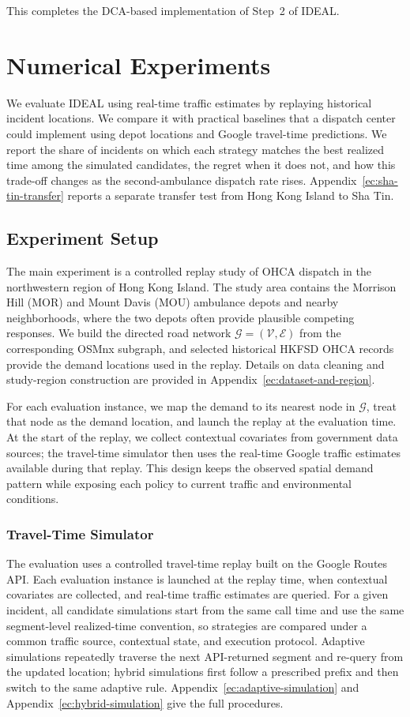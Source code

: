 \documentclass[11pt, letterpaper, oneside, reqno]{amsart}
\begin{document}
This completes the DCA-based implementation of Step~2 of IDEAL.


\section{Numerical Experiments}\label{sec:experiments}
We evaluate IDEAL using real-time traffic estimates by replaying historical incident locations. We compare it with practical baselines that a dispatch center could implement using depot locations and Google travel-time predictions. We report the share of incidents on which each strategy matches the best realized time among the simulated candidates, the regret when it does not, and how this trade-off changes as the second-ambulance dispatch rate rises. Appendix~\ref{ec:sha-tin-transfer} reports a separate transfer test from Hong Kong Island to Sha Tin.

\subsection{Experiment Setup}\label{sec:experiments:setup}
The main experiment is a controlled replay study of OHCA dispatch in the northwestern region of Hong Kong Island. The study area contains the Morrison Hill (MOR) and Mount Davis (MOU) ambulance depots and nearby neighborhoods, where the two depots often provide plausible competing responses. We build the directed road network $\mathcal G = (\mathcal V,\mathcal E)$ from the corresponding OSMnx subgraph, and selected historical HKFSD OHCA records provide the demand locations used in the replay. Details on data cleaning and study-region construction are provided in Appendix~\ref{ec:dataset-and-region}.

For each evaluation instance, we map the demand to its nearest node in $\mathcal G$, treat that node as the demand location, and launch the replay at the evaluation time. At the start of the replay, we collect contextual covariates from government data sources; the travel-time simulator then uses the real-time Google traffic estimates available during that replay. This design keeps the observed spatial demand pattern while exposing each policy to current traffic and environmental conditions.


\subsubsection{Travel-Time Simulator}
The evaluation uses a controlled travel-time replay built on the Google Routes API. Each evaluation instance is launched at the replay time, when contextual covariates are collected, and real-time traffic estimates are queried. For a given incident, all candidate simulations start from the same call time and use the same segment-level realized-time convention, so strategies are compared under a common traffic source, contextual state, and execution protocol. Adaptive simulations repeatedly traverse the next API-returned segment and re-query from the updated location; hybrid simulations first follow a prescribed prefix and then switch to the same adaptive rule. Appendix~\ref{ec:adaptive-simulation} and Appendix~\ref{ec:hybrid-simulation} give the full procedures.
\end{document}
